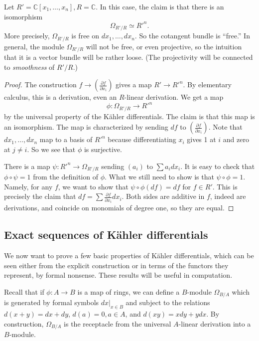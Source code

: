 \begin{example} \label{polynomialringdiff}
Let $R' = \mathbb{C}[x_1, \dots, x_n], R = \mathbb{C}$. In this case, the claim
is that there is an isomorphism
\[ \Omega_{R'/R} \simeq R'^n.  \]
More precisely, $\Omega_{R'/R}$ is free on $dx_1, \dots,dx_n$. So the cotangent
bundle is ``free.'' In general, the module $\Omega_{R'/R}$ will not be free, or
even projective, so the intuition that it is a vector bundle will be rather
loose. (The projectivity will be connected to \emph{smoothness} of $R'/R$.)

\begin{proof} 
The construction $f \to \left( \frac{\partial f}{\partial x_i}  \right)$ gives
a map $R' \to R'^n$. By elementary calculus, this is a derivation, even an
$R$-linear derivation.  We get a map
\[ \phi:\Omega_{R'/R} \to R'^n  \]
by the universal property of the K\"ahler differentials. The claim is that this
map is an isomorphism. The map is characterized by sending $df$ to $\left(
\frac{\partial f}{\partial x_i}\right)$. Note that $dx_1, \dots, dx_n$ map to a
basis of $R'^n$ because differentiating $x_i$ gives 1 at $i$ and zero at $j
\neq i$. So we see that $\phi$ is surjective. 

There is a map $\psi: R'^n \to \Omega_{R'/R}$ sending $\left(a_i  \right)$ to
$\sum a_i dx_i$. It is easy to check that $\phi \circ \psi = 1$ from the
definition of $\phi$. What we still need to show is that $\psi \circ \phi =1$.
Namely, for any $f$, we want to show that $\psi \circ \phi(df) = df$ for $f \in
R'$. This is precisely the claim that $df = \sum \frac{\partial f}{\partial
x_i} dx_i$. Both sides are additive in $f$, indeed are derivations, and
coincide on monomials of degree one, so they are equal.
\end{proof} 

\end{example} 

\subsection{Exact sequences of K\"ahler differentials}
We now want to prove a few basic properties of K\"ahler differentials, which
can be seen either from the explicit construction or in terms of the functors
they represent, by formal nonsense.
These results will be useful in computation.

 Recall that if
$\phi: A \to B$ is a map of rings, we can define a $B$-module
\( \Omega_{B/A}\)  which is generated by formal symbols $ dx|_{x \in
B}$ and subject to the relations $d(x+y) = dx+dy$, $d(a)=0, a \in A$,
and $d(xy) = xdy + ydx$.
By construction, $\Omega_{B/A}$ is the receptacle from the universal $A$-linear
derivation into a $B$-module.

